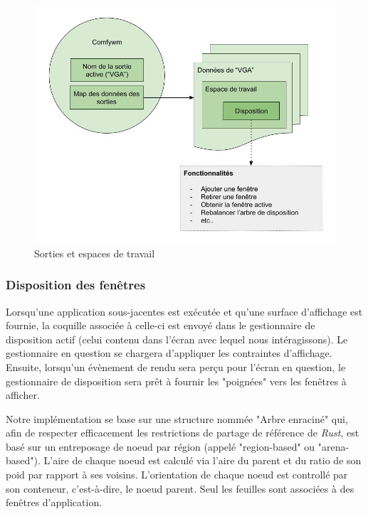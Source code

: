 \documentclass[titlepage]{article}
\begin{document}
\begin{figure}[H]
	\centering
	\includegraphics[width=\textwidth]{sorties_et_espaces_de_travail.jpg}
	\caption{Sorties et espaces de travail}
\end{figure}

\subsubsection{Disposition des fenêtres}
\par
Lorsqu'une application sous-jacentes est exécutée et qu'une surface d'affichage est fournie, la coquille associée à celle-ci est envoyé dans le gestionnaire de disposition actif (celui contenu dans l'écran avec lequel nous intéragissons). Le gestionnaire en question se chargera d'appliquer les contraintes d'affichage. Ensuite, lorsqu'un évènement de rendu sera perçu pour l'écran en question, le gestionnaire de disposition sera prêt à fournir les "poignées" vers les fenêtres à afficher.
\bigskip

\par
Notre implémentation se base sur une structure nommée "Arbre enraciné" qui, afin de respecter efficacement les restrictions de partage de référence de \textit{Rust}, est basé sur un entreposage de noeud par région (appelé "region-based" ou "arena-based"). L'aire de chaque noeud est calculé via l'aire du parent et du ratio de son poid par rapport à ses voisins. L'orientation de chaque noeud est controllé par son conteneur, c'est-à-dire, le noeud parent. Seul les feuilles sont associées à des fenêtres d'application.
\bigskip
\end{document}
